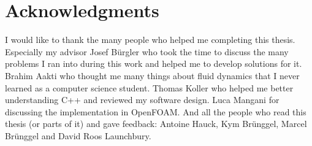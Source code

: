\section*{Acknowledgments}

I would like to thank the many people who helped me completing this thesis. Especially my advisor Josef B\"urgler who took the time to discuss the many problems I ran into during this work and helped me to develop solutions for it. Brahim Aakti who thought me many things about fluid dynamics that I never learned as a computer science student. Thomas Koller who helped me better understanding C++ and reviewed my software design. Luca Mangani for discussing the implementation in OpenFOAM. And all the people who read this thesis (or parts of it) and gave feedback: Antoine Hauck, Kym Br\"unggel, Marcel Br\"unggel and David Roos Launchbury.

